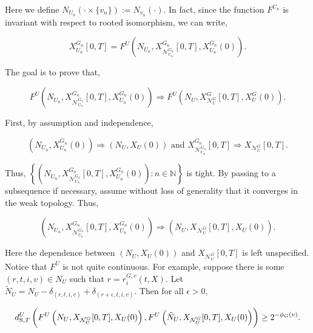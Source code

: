 \documentclass[12pt]{article}
\newcommand{\mb}{\mathbb}
\newcommand{\mc}{\mathcal}
\newcommand{\te}{\text}
\newcommand{\ep}{\epsilon}
\newcommand{\defeq}{:=}								%
\newcommand{\gneigh}[2]{\mc{N}^{#1}_{#2}}			%
\newcommand{\Xf}{X}									%
\newcommand{\poiss}{N}								%
\newcommand{\rate}{r}								%
\newcommand{\stmet}[1]{
\ifstrempty{#1}{
	d_{\te{S}}}{
	d_{\te{S},#1}}}									%
\newcommand{\poissv}[1]{_{#1}}						%
\newcommand{\vind}[1]{_{#1}}						%
\newcommand{\tme}[1]{(#1)}							%
\newcommand{\tmi}[1]{#1}							%
\newcommand{\gind}[1]{^{#1}}						%
\newcommand{\vpara}[1]{^{#1}}						%
\newcommand{\stpara}[1]{_{#1}}						%
\newcommand{\gvpara}[2]{^{#1,#2}}					%
\newcommand{\tmepro}[2]{(#1,#2)}					%
\newcommand{\alt}[1]{\tilde{#1}}					%
\renewcommand{\it}[1]{_{#1}}						%
\begin{document}
Here we define \(\poiss\poissv{U\it{n}}(\cdot\times \{v\it{n}\}) \defeq \poiss\poissv{v\it{n}}(\cdot)\). In fact, since the function \(F\vpara{U\it{n}}\) is invariant with respect to rooted isomorphism, we can write,

\[\Xf\gind{G\it{n}}\vind{U\it{n}}\tmi{[0,T]} = F\vpara{U}\left(\poiss\poissv{U\it{n}}, \Xf\gind{G\it{n}}\vind{\gneigh{G\it{n}}{U\it{n}}}\tmi{[0,T]}, \Xf\gind{G\it{n}}\vind{U\it{n}}\tme{0}\right).\]

The goal is to prove that,

\[F\vpara{U}\left(\poiss\poissv{U\it{n}}, \Xf\gind{G\it{n}}\vind{\gneigh{G\it{n}}{U\it{n}}}\tmi{[0,T]}, \Xf\gind{G\it{n}}\vind{U\it{n}}\tme{0}\right) \Rightarrow F\vpara{U}\left(\poiss\poissv{U}, \Xf\gind{G}\vind{\gneigh{G}{U}}\tmi{[0,T]}, \Xf\gind{G}\vind{U}\tme{0}\right).\]

First, by assumption and independence,

\[\left(\poiss\poissv{U\it{n}},\Xf\gind{G\it{n}}\vind{U\it{n}}\tme{0}\right) \Rightarrow\left(\poiss\poissv{U},\Xf\vind{U}\tme{0}\right)\te{ and } \Xf\gind{G\it{n}}\vind{\gneigh{G\it{n}}{U\it{n}}}\tmi{[0,T]} \Rightarrow \Xf\vind{\gneigh{G}{U}}\tmi{[0,T]}.\]

Thus, \(\left\{\left(\poiss\poissv{U\it{n}},\Xf\gind{G\it{n}}\vind{\gneigh{G\it{n}}{U\it{n}}}\tmi{[0,T]},\Xf\gind{G\it{n}}\vind{U\it{n}}\tme{0}\right): n \in \mb{N}\right\}\) is tight. By passing to a subsequence if necessary, assume without loss of generality that it converges in the weak topology. Thus,

\[\left(\poiss\poissv{U\it{n}},\Xf\gind{G\it{n}}\vind{\gneigh{G\it{n}}{U\it{n}}}\tmi{[0,T]},\Xf\gind{G\it{n}}\vind{U\it{n}}\tme{0}\right) \Rightarrow \left(\poiss\poissv{U},\Xf\vind{\gneigh{G}{U}}\tmi{[0,T]},\Xf\vind{U}\tme{0}\right).\]

Here the dependence between \(\left(\poiss\poissv{U},\Xf\vind{U}\tme{0}\right)\) and \(\Xf\vind{\gneigh{G}{U}}\tmi{[0,T]}\) is left unspecified. Notice that \(F\vpara{U}\) is not quite continuous. For example, suppose there is some \((r,t,i,v) \in \poiss\poissv{U}\) such that \(r = \rate\gvpara{G}{v}\stpara{i}\tmepro{t}{\Xf}\). Let \(\alt{\poiss}\poissv{U} = \poiss\poissv{U} - \delta_{(r,t,i,v)} + \delta_{(r+\ep,t,i,v)}\). Then for all \(\ep > 0\),

\[\stmet{T}\vpara{U}\left(F\vpara{U}\left(\poiss\poissv{U},\Xf\vind{\gneigh{G}{U}}\tmi{[0,T]},\Xf\vind{U}\tme{0}\right), F\vpara{U}\left(\alt{\poiss}\poissv{U},\Xf\vind{\gneigh{G}{U}}\tmi{[0,T]},\Xf\vind{U}\tme{0}\right)\right) \geq 2^{-\phi_G(v)}.\]
\end{document}
